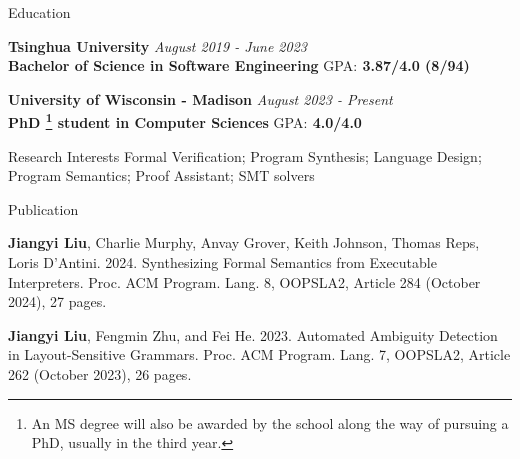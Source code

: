 \documentclass{resume} %
\newcommand{\Jun}{June }
\newcommand{\Aug}{August }
\begin{document}

\begin{rSection}{Education}


{\bf Tsinghua University} \hfill {\em \Aug 2019 - \Jun 2023} 
\\{\bf Bachelor of Science in Software Engineering} \hfill{GPA:\bf{ 3.87/4.0} (8/94)}

{\bf University of Wisconsin - Madison} \hfill {\em \Aug 2023 - Present} 
  \\{\bf PhD \footnote{An MS degree will also be awarded by the school along the way of pursuing a PhD, usually in the third year.} student in Computer Sciences} \hfill{GPA:\bf{ 4.0/4.0}}



\end{rSection}

\begin{rSection}{Research Interests}
Formal Verification; Program Synthesis; Language Design; Program Semantics; Proof Assistant; SMT solvers

\end{rSection}

\begin{rSection}{Publication}
  

  \textbf{Jiangyi Liu}, Charlie Murphy, Anvay Grover, Keith Johnson, Thomas Reps, Loris D'Antini. 2024. Synthesizing Formal Semantics from Executable Interpreters. Proc. ACM Program. Lang. 8, OOPSLA2, Article 284 (October 2024), 27 pages.

  \textbf{Jiangyi Liu}, Fengmin Zhu, and Fei He. 2023. Automated Ambiguity Detection in Layout-Sensitive Grammars. Proc. ACM Program. Lang. 7, OOPSLA2, Article 262 (October 2023), 26 pages.
 
    
\end{rSection}
\end{document}
